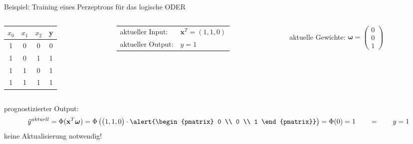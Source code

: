 \documentclass[11pt, aspectratio=169, t]{beamer}
\begin{document}
\begin{frame}{Beispiel: Training eines Perzeptrons für das logische ODER}
\begin{small}
\begin{columns}
\begin{column}{0.25\textwidth}
\hspace{0.5cm}
\begin{footnotesize}
\begin{tabular}{cccc} \toprule
$x_0$ & $x_1$ & $x_2$ & y \\ \midrule
1 & 0 & 0 & 0 \\
1 & 0 & 1 & 1 \\
1 & 1 & 0 & 1 \\
1 & 1 & 1 & 1 \\ \bottomrule
\end{tabular} \end{footnotesize}
\end{column}
\begin{column}{0.4\textwidth}
\begin{tabular}{ll}
aktueller Input: & $\mathbf{x}^{T} = (1, 1, 0)$ \\
aktueller Output: & $y=1$ \\
\end{tabular}
\end{column}
\begin{column}{0.4\textwidth}
aktuelle Gewichte: \alert{ $\boldsymbol{\omega} = \begin{pmatrix} 0 \\ 0 \\ 1 \end{pmatrix}$ }
\end{column}
\end{columns}
prognostizierter Output:
\[\hat{y}^{aktuell} = \Phi(\mathbf{x}^{T}\boldsymbol{\omega}) = \Phi\left( \begin{pmatrix} 1, 1, 0 \end{pmatrix}\cdot \alert{\begin{pmatrix} 0 \\ 0 \\ 1 \end{pmatrix}} \right) = \Phi(0) = 1 \qquad = \qquad y = 1\]
keine Aktualisierung notwendig!
\begin{align*} %
\phantom{\omega_0^{\text{neu}}} & \\
\phantom{\omega_1^{\text{neu}}} & \\
\phantom{\omega_2^{\text{neu}}} &
\end{align*}
\end{small}
\end{frame}
\end{document}

